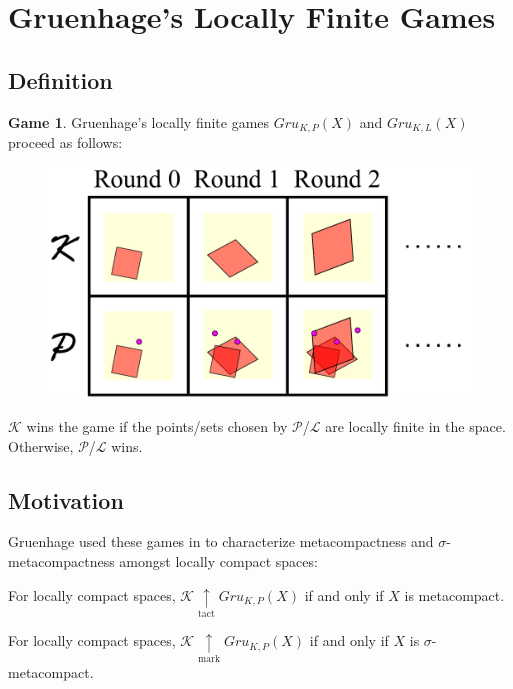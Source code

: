 \documentclass{beamer}
\theoremstyle{definition}
\newtheorem{game}[theorem]{Game}
\newcommand{\markwin}{\underset{\text{mark}}{\uparrow}}
\newcommand{\tactwin}{\underset{\text{tact}}{\uparrow}}
\newcommand{\gruKPGame}[1]{Gru_{K,P}\left({#1}\right)}
\newcommand{\gruKLGame}[1]{Gru_{K,L}\left({#1}\right)}
\newcommand{\<}{\langle}
\renewcommand{\>}{\rangle}
\newcommand{\pl}[1]{\mathscr{#1}}
\begin{document}
\section{Gruenhage's Locally Finite Games}

\subsection{Definition}

\begin{frame}
  \small
  \begin{game}
  Gruenhage's locally finite games $\gruKPGame{X}$ and
  $\gruKLGame{X}$ proceed as follows:
    \begin{figure}
      \includegraphics[width=0.6\linewidth]{compactPointGame.pdf}
    \end{figure}

  $\pl K$ wins the game if the points/sets chosen by $\pl P$/$\pl L$ are
  locally finite in the space. Otherwise, $\pl P$/$\pl L$  wins.
  \end{game}
\end{frame}

\subsection{Motivation}

\begin{frame}
  Gruenhage used these games in \cite{MR752278} to characterize
  metacompactness and $\sigma$-metacompactness amongst locally compact
  spaces:

  \begin{theorem}
    For locally compact spaces, $\pl K\tactwin\gruKPGame{X}$ if and only if
    $X$ is metacompact.
  \end{theorem}

  \begin{theorem}
    For locally compact spaces, $\pl K\markwin\gruKPGame{X}$ if and only if
    $X$ is $\sigma$-metacompact.
  \end{theorem}
\end{frame}
\end{document}
